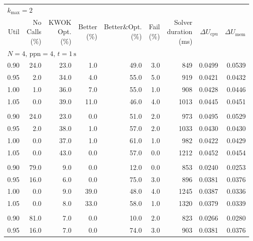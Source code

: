\begin{table}[t]
\tiny
\setlength{\tabcolsep}{3.5pt}
\renewcommand{\arraystretch}{0.95}
\centering
\begin{tabular}{r r r r r r r r r}
\toprule
\multicolumn{9}{l}{$k_{\max}=2$} \\
\addlinespace[0.2em]
Util & No Calls (\%) & KWOK Opt. (\%) & Better (\%) & \makecell{Better\&Opt.\\(\%)} & Fail (\%) & \makecell{Solver\\duration (ms)} & $\Delta U_{\mathrm{cpu}}$ & $\Delta U_{\mathrm{mem}}$ \\
\midrule
\multicolumn{9}{l}{$N=4$, $\mathrm{ppn}=4$, $t=1\,\mathrm{s}$} \\
\midrule
0.90 & 24.0 & 23.0 & 1.0 & 49.0 & 3.0 & 849 & 0.0499 & 0.0539 \\
0.95 & 2.0 & 34.0 & 4.0 & 55.0 & 5.0 & 919 & 0.0421 & 0.0432 \\
1.00 & 1.0 & 36.0 & 7.0 & 55.0 & 1.0 & 908 & 0.0428 & 0.0446 \\
1.05 & 0.0 & 39.0 & 11.0 & 46.0 & 4.0 & 1013 & 0.0445 & 0.0451 \\
\addlinespace[0.35em]
\multicolumn{9}{l}{$N=4$, $\mathrm{ppn}=4$, $t=10\,\mathrm{s}$} \\
\midrule
0.90 & 24.0 & 23.0 & 0.0 & 51.0 & 2.0 & 973 & 0.0495 & 0.0529 \\
0.95 & 2.0 & 38.0 & 1.0 & 57.0 & 2.0 & 1033 & 0.0430 & 0.0430 \\
1.00 & 0.0 & 37.0 & 1.0 & 61.0 & 1.0 & 982 & 0.0422 & 0.0429 \\
1.05 & 0.0 & 43.0 & 0.0 & 57.0 & 0.0 & 1212 & 0.0452 & 0.0454 \\
\addlinespace[0.35em]
\multicolumn{9}{l}{$N=4$, $\mathrm{ppn}=8$, $t=1\,\mathrm{s}$} \\
\midrule
0.90 & 79.0 & 9.0 & 0.0 & 12.0 & 0.0 & 853 & 0.0240 & 0.0253 \\
0.95 & 16.0 & 6.0 & 0.0 & 75.0 & 3.0 & 896 & 0.0381 & 0.0376 \\
1.00 & 0.0 & 9.0 & 39.0 & 48.0 & 4.0 & 1245 & 0.0387 & 0.0336 \\
1.05 & 0.0 & 8.0 & 33.0 & 58.0 & 1.0 & 1320 & 0.0379 & 0.0339 \\
\addlinespace[0.35em]
\multicolumn{9}{l}{$N=4$, $\mathrm{ppn}=8$, $t=10\,\mathrm{s}$} \\
\midrule
0.90 & 81.0 & 7.0 & 0.0 & 10.0 & 2.0 & 823 & 0.0266 & 0.0280 \\
0.95 & 16.0 & 7.0 & 0.0 & 74.0 & 3.0 & 903 & 0.0381 & 0.0376 \\

\end{tabular}
\end{table}
